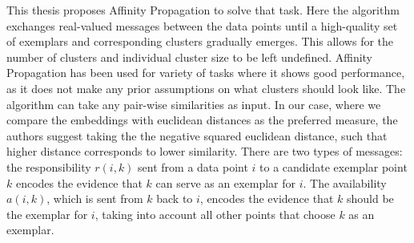 \documentclass[6pt]{article}
\begin{document}
This thesis proposes Affinity Propagation \citep{frey2007clustering} to solve that task. Here the algorithm exchanges real-valued messages between the data points until a high-quality set of exemplars and corresponding clusters
gradually emerges. This allows for the number of clusters and individual cluster size to be left undefined. Affinity Propagation has been used for variety of tasks where it shows good performance, as it does not make any prior assumptions on what clusters should look like.
The algorithm can take any pair-wise similarities as input. In our case, where we compare the embeddings with euclidean distances as the preferred measure, the authors suggest taking the the negative squared euclidean distance, such that higher distance corresponds to  lower similarity. There are two types of messages: the responsibility $r(i,k)$ sent from a data point $i$ to a candidate exemplar point $k$ encodes the evidence that $k$ can serve as an exemplar for $i$. The availability $a(i,k)$, which is sent from $k$ back to $i$, encodes the evidence that $k$ should be the exemplar for $i$, taking into account all other points that choose $k$ as an exemplar.
\end{document}

